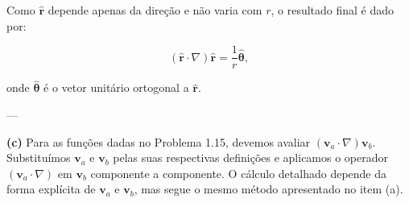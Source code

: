 \documentclass[a4paper,12pt]{article}
\newcommand{\printingbibliography}{%

    \pagestyle{myheadings}
    \markright{}
    \sloppy
    \printbibliography[heading=bibintoc, %
                   title=Refer\^encias %
                  ]
    \fussy%
}
\begin{document}
Como $\hat{\mathbf{r}}$ depende apenas da direção e não varia com $r$, o resultado final é dado por:

\begin{equation}
(\hat{\mathbf{r}} \cdot \nabla)\hat{\mathbf{r}} = \frac{1}{r}\hat{\mathbf{\theta}},
\end{equation}

onde $\hat{\mathbf{\theta}}$ é o vetor unitário ortogonal a $\hat{\mathbf{r}}$.

---

\textbf{(c)} Para as funções dadas no Problema 1.15, devemos avaliar $(\mathbf{v}_a \cdot \nabla)\mathbf{v}_b$. 
Substituímos $\mathbf{v}_a$ e $\mathbf{v}_b$ pelas suas respectivas definições e aplicamos o operador $(\mathbf{v}_a \cdot \nabla)$ em $\mathbf{v}_b$ 
componente a componente. O cálculo detalhado depende da forma explícita de $\mathbf{v}_a$ e $\mathbf{v}_b$, mas segue o mesmo método 
apresentado no item (a).

\end{document}
